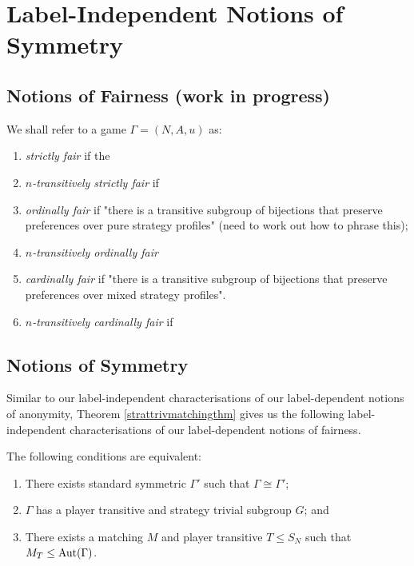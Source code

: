 \section{Label-Independent Notions of Symmetry} \label{sec:labindnotions}
\subsection{Notions of Fairness (work in progress)} %

\begin{definition}
	We shall refer to a game $\Gamma = (N, A, u)$ as:
	\begin{enumerate}
		\item \textit{strictly fair} if the 
		\item \textit{$n$-transitively strictly fair} if
		\item \textit{ordinally fair} if "there is a transitive subgroup of bijections that preserve preferences over pure strategy profiles" (need to work out how to phrase this);
		\item \textit{$n$-transitively ordinally fair} 
		\item \textit{cardinally fair} if "there is a transitive subgroup of bijections that preserve preferences over mixed strategy profiles". 
		\item \textit{$n$-transitively cardinally fair} if 
	\end{enumerate}
\end{definition}

\subsection{Notions of Symmetry} \label{subsec:labelindepnotionsofsymmetry}
Similar to our label-independent characterisations of our label-dependent notions of anonymity, Theorem \ref{strattrivmatchingthm} gives us the following label-independent characterisations of our label-dependent notions of fairness.

\begin{corollary} \label{indchar1}
	The following conditions are equivalent:
	\begin{enumerate}
		\item There exists standard symmetric $\Gamma'$ such that $\Gamma \cong \Gamma'$;
		\item $\Gamma$ has a player transitive and strategy trivial subgroup $G$; and
		\item There exists a matching $M$ and player transitive $T \leq S_N$ such that $M_{T} \leq \operatorname*{Aut}(\Gamma)$.
	\end{enumerate}
\end{corollary}

